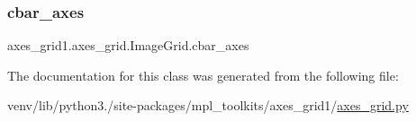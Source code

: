 \subsubsection{\texorpdfstring{cbar\+\_\+axes}{cbar\_axes}}
{\footnotesize\ttfamily axes\+\_\+grid1.\+axes\+\_\+grid.\+Image\+Grid.\+cbar\+\_\+axes}



The documentation for this class was generated from the following file\+:\begin{DoxyCompactItemize}
\item 
venv/lib/python3./site-\/packages/mpl\+\_\+toolkits/axes\+\_\+grid1/\hyperlink{axes__grid1_2axes__grid_8py}{axes\+\_\+grid.\+py}\end{DoxyCompactItemize}
